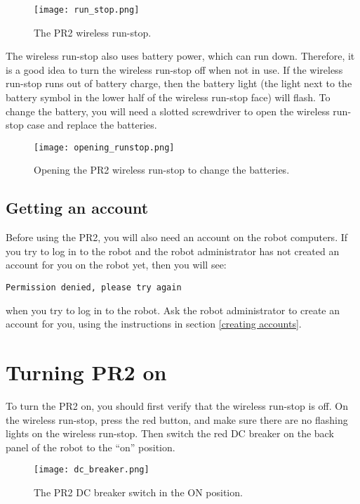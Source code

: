 \begin{figure}[h]
\centering
\texttt{[image: run\_stop.png]}
\caption{The PR2 wireless run-stop.}
\label{fig:runstop}
\end{figure}

The wireless run-stop also uses battery power, which can run down. Therefore, it is a good idea to turn the wireless run-stop off when not in use. If the wireless run-stop runs out of battery charge, then the battery light (the light next to the battery symbol in the lower half of the wireless run-stop face) will flash. To change the battery, you will need a slotted screwdriver to open the wireless run-stop case and replace the batteries.

\begin{figure}[!h]
\centering
\texttt{[image: opening\_runstop.png]}
\caption{Opening the PR2 wireless run-stop to change the batteries.}
\label{fig:opening-runstop}
\end{figure}

\subsection{Getting an account}
Before using the PR2, you will also need an account on the robot computers.  If you try to log in to the robot and the 
robot administrator has not created an account for you on the robot yet, then you will see:
\begin{verbatim}
Permission denied, please try again
\end{verbatim}
when you try to log in to the robot. Ask the robot administrator to create an account for you, using the instructions 
in section \ref{creating accounts}.
\section{Turning PR2 on}
To turn the PR2 on, you should first verify that the wireless run-stop is off. On the wireless run-stop, press the 
red button, and make sure there are no flashing lights on the wireless run-stop. Then switch the red DC breaker on 
the back panel of the robot to the ``on'' position.  

\begin{figure}[h]
\centering
\texttt{[image: dc\_breaker.png]}
\caption{The PR2 DC breaker switch in the ON position.}
\label{fig:dc_breaker}
\end{figure}

